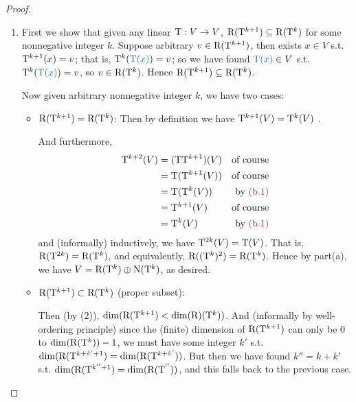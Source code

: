 \begin{proof}
\begin{enumerate}
\item
First we show that given any linear \(\mathrm{T} : V \to V\), \(\mathrm{R}(\mathrm{T}^{k + 1}) \subseteq \mathrm{R}(\mathrm{T}^k)\) for some nonnegative integer \(k\).
Suppose arbitrary \(v \in \mathrm{R}(\mathrm{T}^{k + 1})\), then exists \(x \in V\) s.t. \(\mathrm{T}^{k + 1}(x) = v\);
that is, \(\T^k(\BLUE{\T(x)}) = v\);
so we have found \(\BLUE{\T(x)} \in V\) s.t. \(\T^k(\BLUE{\T(x)}) = v\), so \(v \in \mathrm{R}(\mathrm{T}^k)\).
Hence \(\mathrm{R}(\mathrm{T}^{k + 1}) \subseteq \mathrm{R}(\mathrm{T}^k)\).

Now given arbitrary nonnegative integer \(k\), we have two cases:
\begin{itemize}
    \item \(\mathrm{R}(\mathrm{T}^{k + 1}) = \mathrm{R}(\mathrm{T}^k)\): Then by definition we have \(\mathrm{T}^{k + 1}(V) = \mathrm{T}^k(V)\) .
    
    And furthermore,
    \begin{align*}
        \T^{k + 2}(V) & = (\T \T^{k+1})(V) & \text{of course} \\
                      & = \T(\T^{k + 1}(V)) & \text{of course} \\
                      & = \T(\T^k(V)) & \text{by \MAROON{(b.1)}} \\
                      & = \T^{k + 1}(V) & \text{of course} \\
                      & = \T^k(V) & \text{by \MAROON{(b.1)}}
    \end{align*}
    and (informally) inductively, we have \(\mathrm{T}^{2k}(V) = \mathrm{T}(V)\).
    That is, \(\mathrm{R}(\mathrm{T}^{2k}) = \mathrm{R}(\mathrm{T}^k)\), and equivalently, \(\mathrm{R}((\mathrm{T}^k)^2) = \mathrm{R}(\mathrm{T}^k)\).
    Hence by part(a), we have \(V = \mathrm{R}(\mathrm{T}^k) \oplus \mathrm{N}(\mathrm{T}^k)\), as desired.
    
    \item \(\mathrm{R}(\mathrm{T}^{k + 1}) \subset \mathrm{R}(\mathrm{T}^k)\) (proper subset):

    Then (by (2)), \(\dim(\mathrm{R}(\mathrm{T}^{k + 1}) < \dim(\mathrm{R})(\mathrm{T}^k))\).
    And (informally by well-ordering principle) since the (finite) dimension of \(\mathrm{R}(\mathrm{T}^{k + 1})\) can only be \(0\) to \(\dim(\mathrm{R}(\mathrm{T}^k)) - 1\), we must have some integer \(k'\) s.t. \(\dim(\RANGE(\T^{k + \RED{k'} + 1}) = \dim(\RANGE(\T^{k + \RED{k'}}))\).
    But then we have found \(k'' = k + k'\) s.t. \(\dim(\mathrm{R}(\mathrm{T}^{k'' + 1}) = \dim(\mathrm{R}(\mathrm{T}^{''}))\), and this falls back to the previous case.
\end{itemize}
\end{enumerate}
\end{proof}

